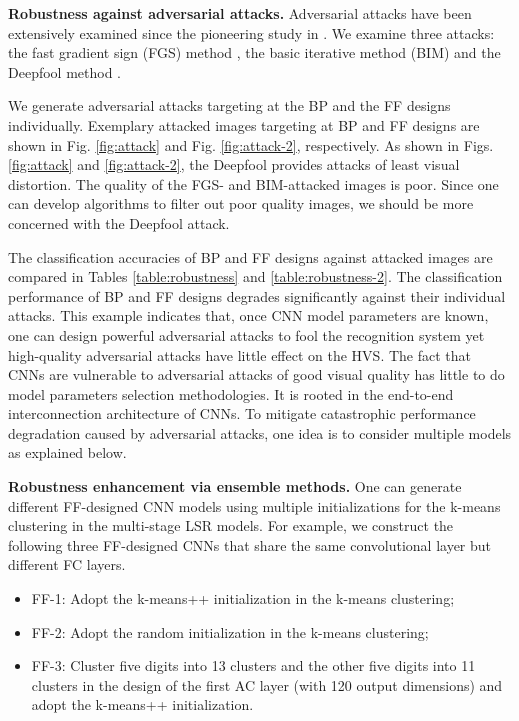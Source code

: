 \documentclass[preprint,12pt]{elsarticle}
\begin{document}
{\bf Robustness against adversarial attacks.} Adversarial attacks have
been extensively examined since the pioneering study in
\cite{szegedy2013intriguing}. We examine three attacks: the fast
gradient sign (FGS) method \cite{goodfellow2014explaining}, the basic
iterative method (BIM) \cite{kurakin2016adversarial} and the Deepfool
method \cite{moosavi2016deepfool}.  

We generate adversarial attacks targeting at the BP and the FF designs
individually. Exemplary attacked images targeting at BP and FF designs
are shown in Fig. \ref{fig:attack} and Fig.  \ref{fig:attack-2},
respectively.  As shown in Figs. \ref{fig:attack} and
\ref{fig:attack-2}, the Deepfool provides attacks of least visual
distortion.  The quality of the FGS- and BIM-attacked images is poor.
Since one can develop algorithms to filter out poor quality images, we
should be more concerned with the Deepfool attack. 

The classification accuracies of BP and FF designs against attacked
images are compared in Tables \ref{table:robustness} and
\ref{table:robustness-2}.  The classification performance of BP and FF
designs degrades significantly against their individual attacks.  This
example indicates that, once CNN model parameters are known, one can
design powerful adversarial attacks to fool the recognition system yet
high-quality adversarial attacks have little effect on the HVS.  The
fact that CNNs are vulnerable to adversarial attacks of good visual
quality has little to do model parameters selection methodologies. It is
rooted in the end-to-end interconnection architecture of CNNs. To
mitigate catastrophic performance degradation caused by adversarial
attacks, one idea is to consider multiple models as explained below. 

{\bf Robustness enhancement via ensemble methods.} One can generate
different FF-designed CNN models using multiple initializations for the
k-means clustering in the multi-stage LSR models.  For example, we
construct the following three FF-designed CNNs that share the same
convolutional layer but different FC layers. 
\begin{itemize}
\item FF-1: Adopt the k-means++ initialization \cite{arthur2007k} in the
k-means clustering;
\item FF-2: Adopt the random initialization in the k-means clustering;
\item FF-3: Cluster five digits into 13 clusters and the other five
digits into 11 clusters in the design of the first AC layer (with 120
output dimensions) and adopt the k-means++ initialization.
\end{itemize}
\end{document}
